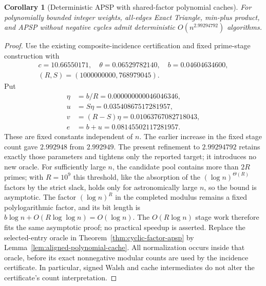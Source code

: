 \documentclass[11pt]{article}
\newtheorem{corollary}[theorem]{Corollary}
\begin{document}
\begin{corollary}[Deterministic APSP with shared-factor polynomial caches]
\label{cor:aligned-cache-apsp}
For polynomially bounded integer weights, all-edges Exact Triangle,
min-plus product, and APSP without negative cycles admit deterministic
$O(n^{2.99294792})$ algorithms.
\end{corollary}
\begin{proof}
Use the existing composite-incidence certification and fixed prime-stage
construction with
\[
 \begin{gathered}
 c=10.66550171,\quad\theta=0.06529782140,\quad b=0.04604634600,\\
 (R,S)=(1000000000,768979045).
 \end{gathered}
\]
Put
\[
 \begin{aligned}
 \eta&=b/R=0.000000000046046346,\\
 u&=S\eta=0.03540867517281957,\\
 v&=(R-S)\eta=0.01063767082718043,\\
 e&=b+u=0.08145502117281957.
 \end{aligned}
\]
These are fixed constants independent of $n$. The earlier increase in the
fixed stage count gave $2.992948$ from $2.992949$. The present refinement
to $2.99294792$ retains exactly those parameters and tightens only the
reported target; it introduces no new oracle.
For sufficiently large $n$, the candidate pool contains more than $2R$
primes; with $R=10^9$ this threshold, like the absorption of the
$(\log n)^{\Theta(R)}$ factors by the strict slack, holds only for
astronomically large $n$, so the bound is asymptotic. The factor $(\log n)^R$ in the completed modulus remains a fixed
polylogarithmic factor, and its bit length is
$b\log n+O(R\log\log n)=O(\log n)$. The $O(R\log n)$ stage work
therefore fits the same asymptotic proof; no practical speedup is asserted.
Replace the selected-entry oracle in Theorem~\ref{thm:cyclic-factor-apsp}
by Lemma~\ref{lem:aligned-polynomial-cache}. All normalization occurs
inside that oracle, before its exact nonnegative modular counts are
used by the incidence certificate. In particular, signed Walsh and
cache intermediates do not alter the certificate's count interpretation.


\end{proof}
\end{document}
